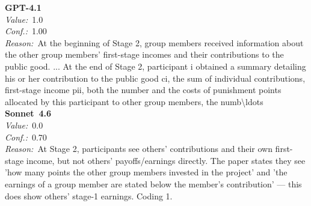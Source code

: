 \documentclass[11pt,a4paper]{article}
\begin{document}
\begin{tcolorbox}[
  title={\textbf{CONFIG\_showOtherSummaries} \textbar{} DOI: 10.1016\_j.socec.2014.09.001 \textbar{} Cond.~0},
  colback=blue!3!white,
  colframe=blue!45!black,
  fonttitle=\small\sffamily,
  sidebyside,
  sidebyside align=top seam,
  lower separated=false,
  breakable,
  before upper={\small},
  before lower={\small},
]
\textbf{GPT-4.1}\\[2pt]
\textit{Value:}~1.0\\[3pt]
\textit{Conf.:}~1.00\\[3pt]
\textit{Reason:}~At the beginning of Stage 2, group members received information about the other group members' first-stage incomes and their contributions to the public good. ... At the end of Stage 2, participant i obtained a summary detailing his or her contribution to the public good ci, the sum of individual contributions, first-stage income pii, both the number and the costs of punishment points allocated by this participant to other group members, the numb\textbackslash{}ldots
\tcblower
\textbf{Sonnet~4.6}\\[2pt]
\textit{Value:}~0.0\\[3pt]
\textit{Conf.:}~0.70\\[3pt]
\textit{Reason:}~At Stage 2, participants see others' contributions and their own first-stage income, but not others' payoffs/earnings directly. The paper states they see 'how many points the other group members invested in the project' and 'the earnings of a group member are stated below the member's contribution' --- this does show others' stage-1 earnings. Coding 1.
\end{tcolorbox}
\end{document}
